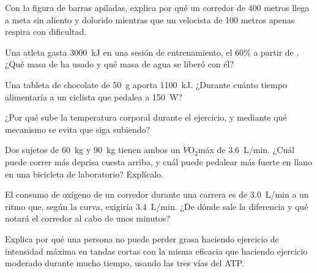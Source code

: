 \begin{exercise}[$\star\star$]\label{exo:g10:exercise-and-energy:8}
Con la figura de barras apiladas, explica por qué un corredor de 400
metros llega a meta sin aliento y dolorido mientras que un
velocista de 100 metros apenas respira con dificultad.
\end{exercise}

\begin{exercise}[$\star\star$]\label{exo:g10:exercise-and-energy:9}
Una atleta gasta \qty{3000}{kJ} en una sesión de entrenamiento, el 60\%
a partir de . ¿Qué masa de  ha usado y qué masa de
agua se liberó con él?
\end{exercise}

\begin{exercise}[$\star\star$]\label{exo:g10:exercise-and-energy:10}
Una tableta de chocolate de \qty{50}{g} aporta \qty{1100}{kJ}. ¿Durante
cuánto tiempo alimentaría a un ciclista que pedalea a \qty{150}{W}?
\end{exercise}

\begin{exercise}[$\star\star$]\label{exo:g10:exercise-and-energy:11}
¿Por qué sube la temperatura corporal durante el ejercicio, y mediante
qué mecanismo se evita que siga subiendo?
\end{exercise}

\begin{exercise}[$\star\star\star$]\label{exo:g10:exercise-and-energy:12}
Dos sujetos de \qty{60}{kg} y \qty{90}{kg} tienen ambos un
$\dot V\!\mathrm{O_2}$máx de \qty{3.6}{L/min}. ¿Cuál puede correr más
deprisa cuesta arriba, y cuál puede pedalear más fuerte en llano en una
bicicleta de laboratorio? Explícalo.
\end{exercise}

\begin{exercise}[$\star\star\star$]\label{exo:g10:exercise-and-energy:13}
El consumo de oxígeno de un corredor durante una carrera es de
\qty{3.0}{L/min} a un ritmo que, según la curva, exigiría
\qty{3.4}{L/min}. ¿De dónde sale la diferencia y qué notará el corredor
al cabo de unos minutos?
\end{exercise}

\begin{exercise}[$\star\star\star$]\label{exo:g10:exercise-and-energy:14}
Explica por qué una persona no puede perder grasa haciendo ejercicio de
intensidad máxima en tandas cortas con la misma eficacia que haciendo
ejercicio moderado durante mucho tiempo, usando las tres vías del ATP.
\end{exercise}

